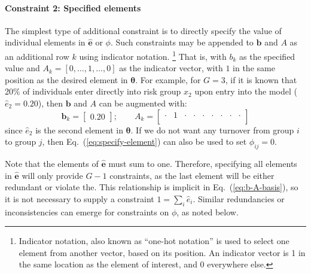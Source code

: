 \paragraph{Constraint 2: Specified elements}
The simplest type of additional constraint is to
directly specify the value of individual elements in $\bm{\hat{e}}$ or $\phi$.
Such constraints may be appended to $\bm{b}$ and $A$
as an additional row $k$ using indicator notation.%
\footnote{Indicator notation, also known as ``one-hot notation'' is used to
  select one element from another vector, based on its position.
  An indicator vector is 1 in the same location as the element of interest,
  and 0 everywhere else.}
That is, with $b_k$ as the specified value
and $A_k = [0,\dots,1,\dots,0]$ as the indicator vector,
with $1$ in the same position as the desired element in $\bm{\theta}$.
For example, for $G = 3$, if it is known that 20\% of individuals
enter directly into risk group $x_2$ upon entry into the model ($\hat{e}_2 = 0.20$),
then $\bm{b}$ and $A$ can be augmented with:
\begin{equation}\label{eq:specify-element}
\bm{b}_k = \left[\begin{array}{c} 0.20 \end{array}\right];\qquad
A_k = \left[\begin{array}{ccccccccc}
\cdot & 1 & \cdot & \cdot & \cdot & \cdot & \cdot & \cdot & \cdot \\
\end{array}\right] 
\end{equation}
since $\hat{e}_2$ is the second element in $\bm{\theta}$.
If we do not want any turnover from group $i$ to group $j$,
then Eq.~(\ref{eq:specify-element}) can also be used to set $\phi_{ij} = 0$.
\par
Note that the elements of $\bm{\hat{e}}$ must sum to one.
Therefore, specifying all elements in $\bm{\hat{e}}$
will only provide $G-1$ constraints,
as the last element will be either redundant or violate the.
This relationship is implicit in Eq.~(\ref{eq:b-A-basis}),
so it is not necessary to supply a constraint $1 = \sum_{i} \hat{e}_i$.
Similar redundancies or inconsistencies can emerge for constraints on $\phi$, as noted below.
